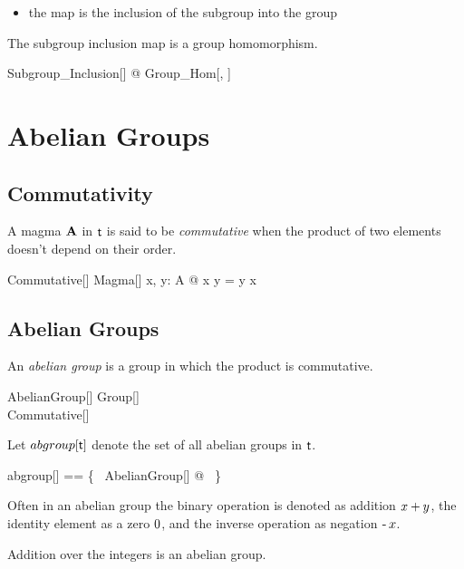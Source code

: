 \documentclass{amsart}
\begin{document}
\begin{itemize}
	\item the map is the inclusion of the subgroup into the group
\end{itemize}

\begin{remark}
The subgroup inclusion map is a group homomorphism.

\begin{zed}
	\forall Subgroup\_Inclusion[\setT] @ Group\_Hom[\setT, \setT]
\end{zed}

\end{remark}

\section{Abelian Groups}

\subsection{Commutativity}

A magma $\mathbf{A}$ in $\mathsf{t}$ is said to be {\em commutative} when the product of two elements doesn't depend on 
their order.
\begin{schema}{Commutative}[\genT]
	Magma[\genT]
\where
	\forall x, y: A @ x \opG y = y \opG x
\end{schema}

\subsection{Abelian Groups}

An \textit{abelian group} is a group in which the product is commutative.

\begin{schema}{AbelianGroup}[\genT]
	Group[\genT] \\
	Commutative[\genT]
\end{schema}

Let $abgroup[\mathsf{t}]$ denote the set of all abelian groups in $\mathsf{t}$.
\begin{zed}
	abgroup[\genT] == \{~ AbelianGroup[\genT] @ \strucA ~\}
\end{zed}

Often in an abelian group the binary operation is denoted as addition $x \mathbin{+} y$,
the identity element as a zero $0$, and the inverse operation as negation $\operatorname{-} x$.

\begin{example}
Addition over the integers is an abelian group.


\end{example}
\end{document}
